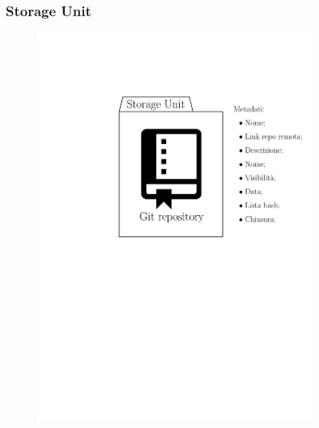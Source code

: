\documentclass{beamer}
\begin{document}
\begin{frame}
	\frametitle{Storage Unit}
	\centering
	\begin{figure}
		\includegraphics[width=0.8\textwidth]{figures/repo.pdf}
	\end{figure}
\end{frame}
\end{document}
